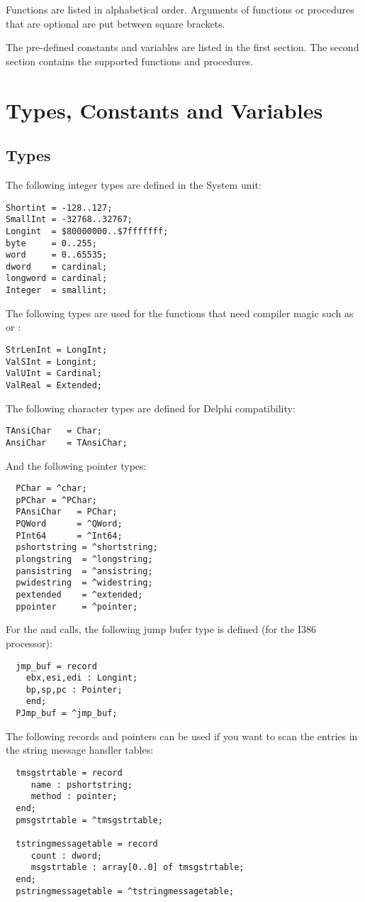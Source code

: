 \documentclass{report}
\begin{document}
Functions are listed in alphabetical order. Arguments of functions or 
procedures that are optional are put between square brackets.

The pre-defined constants and variables are listed in the first section. The
second section contains the supported functions and procedures.

\section{Types, Constants and Variables}

\subsection{Types}
The following integer types are defined in the System unit:
\begin{verbatim}
Shortint = -128..127;
SmallInt = -32768..32767;
Longint  = $80000000..$7fffffff;
byte     = 0..255;
word     = 0..65535;
dword    = cardinal;
longword = cardinal;
Integer  = smallint;
\end{verbatim}
The following types are used for the functions that need compiler magic
such as  or :
\begin{verbatim}
StrLenInt = LongInt;
ValSInt = Longint; 
ValUInt = Cardinal;
ValReal = Extended;
\end{verbatim}
The following character types are defined for Delphi compatibility:
\begin{verbatim}
TAnsiChar   = Char;
AnsiChar    = TAnsiChar;
\end{verbatim}
And the following pointer types:
\begin{verbatim}
  PChar = ^char;
  pPChar = ^PChar;
  PAnsiChar   = PChar;
  PQWord      = ^QWord;
  PInt64      = ^Int64;
  pshortstring = ^shortstring;
  plongstring  = ^longstring; 
  pansistring  = ^ansistring; 
  pwidestring  = ^widestring; 
  pextended    = ^extended;   
  ppointer     = ^pointer;    
\end{verbatim}
For the  and  calls, the following jump bufer
type is defined (for the I386 processor):
\begin{verbatim}
  jmp_buf = record
    ebx,esi,edi : Longint;
    bp,sp,pc : Pointer;
    end;
  PJmp_buf = ^jmp_buf;
\end{verbatim}
The following records and pointers can be used if you want to scan the 
entries in the string message handler tables:
\begin{verbatim}
  tmsgstrtable = record
     name : pshortstring;
     method : pointer;   
  end;
  pmsgstrtable = ^tmsgstrtable;

  tstringmessagetable = record
     count : dword;
     msgstrtable : array[0..0] of tmsgstrtable;
  end;
  pstringmessagetable = ^tstringmessagetable;
\end{verbatim}
\end{document}
